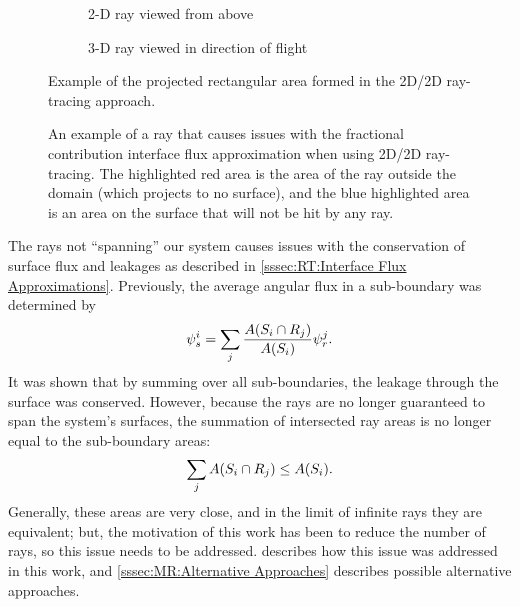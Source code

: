 {{{      \begin{figure}[htbp]
          \centering
          \begin{subfigure}[t]{0.45\textwidth}
              \centering
              \def\svgwidth{0.70\linewidth}
              
              \caption{2-D ray viewed from above\label{fig:MR:MacroRayProjections}}
          \end{subfigure}%
          \begin{subfigure}[t]{0.45\textwidth}
              \centering
              \def\svgwidth{0.70\linewidth}
              
              \caption{3-D ray viewed in direction of flight\label{fig:MR:MacroRayProjectionsDOF}}
          \end{subfigure}
          \caption{Example of the projected rectangular area formed in the 2D/2D ray-tracing approach.}
          \label{figs:MR:MacroRayProjections}
      \end{figure}

      \begin{figure}[htbp]
        \centering
        \def\svgwidth{0.25\linewidth}
        
        \caption{
            An example of a ray that causes issues with the fractional contribution interface flux approximation when using 2D/2D ray-tracing.
            The highlighted red area is the area of the ray outside the domain (which projects to no surface), and the blue highlighted area is an area on the surface that will not be hit by any ray.}
        \label{fig:MR:MacroRayProjectionProblem}
      \end{figure}

      The rays not ``spanning'' our system causes issues with the conservation of surface flux and leakages as described in \cref{sssec:RT:Interface Flux Approximations}.
      Previously, the average angular flux in a sub-boundary was determined by
      \begin{equation}\label{eq:MR:Old SubBoundary Flux}
        \psi_s^i = \suml[j] \frac{A(S_i\cap R_j)}{A(S_i)}\psi_r^j.
      \end{equation}
      It was shown that by summing over all sub-boundaries, the leakage through the surface was conserved.
      However, because the rays are no longer guaranteed to span the system's surfaces, the summation of intersected ray areas is no longer equal to the sub-boundary areas:
      \begin{equation}\label{eq:MR:Area Imbalance}
        \suml[j] A(S_i\cap R_j) \leq A(S_i).
      \end{equation}
      Generally, these areas are very close, and in the limit of infinite rays they are equivalent; but, the motivation of this work has been to reduce the number of rays, so this issue needs to be addressed.
       describes how this issue was addressed in this work, and \cref{sssec:MR:Alternative Approaches} describes possible alternative approaches.

}}}
